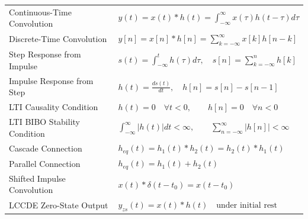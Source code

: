 \documentclass[12pt,a4paper]{article}
\renewcommand{\arraystretch}{1.45}
\begin{document}
\begin{tcolorbox}[formulabox, title={\textbf{Key Formulas at a Glance}}]
\renewcommand{\arraystretch}{1.35}
\begin{tabularx}{\linewidth}{B{5.0cm} X}
Continuous-Time Convolution & $y(t) = x(t) * h(t) = \int_{-\infty}^{\infty} x(\tau) h(t - \tau) d\tau$ \\[4pt]
Discrete-Time Convolution & $y[n] = x[n] * h[n] = \sum_{k=-\infty}^{\infty} x[k] h[n - k]$ \\[4pt]
Step Response from Impulse & $s(t) = \int_{-\infty}^t h(\tau) d\tau, \quad s[n] = \sum_{k=-\infty}^n h[k]$ \\[4pt]
Impulse Response from Step & $h(t) = \frac{ds(t)}{dt}, \quad h[n] = s[n] - s[n-1]$ \\[4pt]
LTI Causality Condition & $h(t) = 0 \quad \forall t < 0, \qquad h[n] = 0 \quad \forall n < 0$ \\[4pt]
LTI BIBO Stability Condition & $\int_{-\infty}^{\infty} |h(t)| dt < \infty, \qquad \sum_{n=-\infty}^{\infty} |h[n]| < \infty$ \\[4pt]
Cascade Connection & $h_{eq}(t) = h_1(t) * h_2(t) = h_2(t) * h_1(t)$ \\[4pt]
Parallel Connection & $h_{eq}(t) = h_1(t) + h_2(t)$ \\[4pt]
Shifted Impulse Convolution & $x(t) * \delta(t - t_0) = x(t - t_0)$ \\[4pt]
LCCDE Zero-State Output & $y_{zs}(t) = x(t) * h(t) \quad \text{under initial rest}$ \\[4pt]
\end{tabularx}
\end{tcolorbox}
\end{document}

